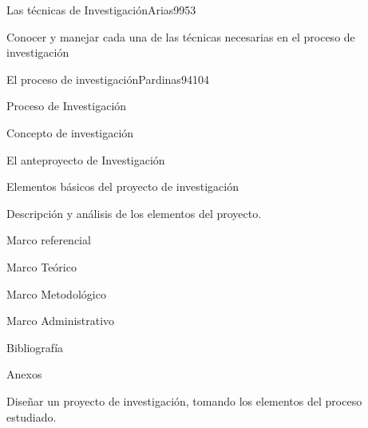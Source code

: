 \begin{syllabus}
\begin{unit}{Las técnicas de Investigación}{Arias99}{5}{3}
   \begin{unitgoals}
      \item Conocer y manejar cada una de las técnicas necesarias en el proceso de investigación
   \end{unitgoals}
\end{unit}

\begin{unit}{El proceso de investigación}{Pardinas94}{10}{4}
   \begin{topics}
      \item Proceso de Investigación
	\item Concepto de investigación
	\item El anteproyecto de Investigación 
	\item Elementos básicos del proyecto de investigación
	\item Descripción y análisis de los elementos del proyecto.
	\item Marco referencial
	\item Marco Teórico
	\item Marco Metodológico
	\item Marco Administrativo
	\item Bibliografía 
	\item Anexos
   \end{topics}

   \begin{unitgoals}
      \item Diseñar un proyecto de investigación, tomando los elementos del proceso estudiado.
   \end{unitgoals}
\end{unit}

\begin{coursebibliography}
\end{coursebibliography}
\end{syllabus}
